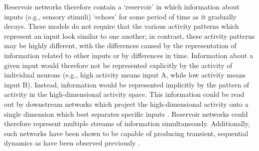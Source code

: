 \bigskip
Reservoir networks therefore contain a ‘reservoir’ in which information about inputs (e.g., sensory stimuli) ‘echoes’ for some period of time as it gradually decays. These models do not require that the various activity patterns which represent an input look similar to one another; in contrast, these activity patterns may be highly different, with the differences caused by the representation of information related to other inputs or by differences in time. Information about a given input would therefore not be represented explicitly by the activity of individual neurons (e.g., high activity means input A, while low activity means input B). Instead, information would be represented implicitly by the pattern of activity in the high-dimensional activity space. This information could be read out by downstream networks which project the high-dimensional activity onto a single dimension which best separates specific inputs \citep{Hoerzer:2014cz, Jaeger:2004hj, Sussillo:2009gh, Buonomano:2009cw, Maass:2002kf, Natschlager:2005ju}. Reservoir networks could therefore represent multiple streams of information simultaneously. Additionally, such networks have been shown to be capable of producing transient, sequential dynamics as have been observed previously \citep{Rajan:2016cp, Klampfl:2013gq}.

